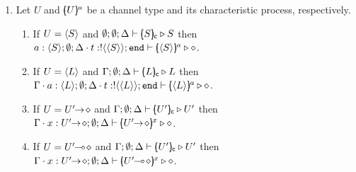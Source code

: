 \begin{proposition}
\begin{enumerate}
		\item	Let $U$ and $[\!\!(U)\!\!]^{a}$  be a channel type and its characteristic process, respectively.
		\begin{enumerate}
			\item	If $U = \langle S \rangle$ and $\emptyset; \emptyset; \Delta \vdash [\!\!(S)\!\!]_{\mathsf{c}} \triangleright S$ then \\
					$a: \langle S \rangle; \emptyset; \Delta \cdot t: ! \langle \langle S \rangle \rangle ; \mathtt{end} \vdash [\!\!(\langle S \rangle)\!\!]^{a} \triangleright \diamond$.
	
			\item	If $U = \langle L \rangle$ and $\Gamma; \emptyset; \Delta \vdash [\!\!(L)\!\!]_{\mathsf{c}} \triangleright L$ then \\
					$\Gamma \cdot a: \langle L \rangle; \emptyset; \Delta \cdot t: ! \langle \langle L \rangle \rangle ; \mathtt{end} \vdash [\!\!(\langle L \rangle)\!\!]^{a} \triangleright \diamond$.
	
			\item	If $U = U'\!\! \rightarrow\! \diamond$ and  $\Gamma; \emptyset; \Delta \vdash [\!\!(U')\!\!]_{\mathsf{c}} \triangleright U'$ then \\
					$\Gamma \cat x: \shot{U'}; \es;\Delta \proves \mapchar{\shot{U'}}{x} \hastype \Proc$.
	
			\item
					If $U = U'\!\! \multimap\! \diamond$ and   $\Gamma; \emptyset; \Delta \vdash [\!\!(U')\!\!]_{\mathsf{c}} \triangleright U'$ then \\
					$\Gamma \cat x: \shot{U'}; \es;\Delta \proves \mapchar{\lhot{U'}}{x} \hastype \Proc$.
		\end{enumerate}
	\end{enumerate}
\end{proposition}

